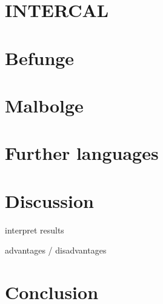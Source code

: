 \documentclass{sig-alternate}
\begin{document}


\section{INTERCAL}



\section{Befunge}



\section{Malbolge}



\section{Further languages}

\section{Discussion}

\blindtext[3]

interpret results

advantages / disadvantages

\section{Conclusion}

\blindtext[2]



\end{document}
